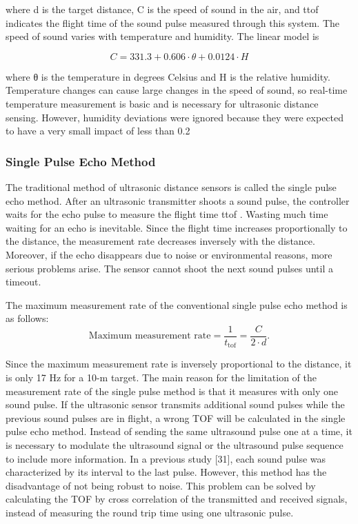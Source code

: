 where d is the target distance, C is the speed of sound in the air, and ttof indicates the flight time of the sound pulse measured through this system. The speed of sound varies with temperature and humidity. The linear model is

\begin{equation*} C = 331.3 + 0.606 \cdot \theta + 0.0124 \cdot H \tag{2}\end{equation*}

where θ is the temperature in degrees Celsius and H is the relative humidity. Temperature changes can cause large changes in the speed of sound, so real-time temperature measurement is basic and is necessary for ultrasonic distance sensing. However, humidity deviations were ignored because they were expected to have a very small impact of less than 0.2 %

\subsubsection{Single Pulse Echo Method}
The traditional method of ultrasonic distance sensors is called the single pulse echo method. After an ultrasonic transmitter shoots a sound pulse, the controller waits for the echo pulse to measure the flight time ttof . Wasting much time waiting for an echo is inevitable. Since the flight time increases proportionally to the distance, the measurement rate decreases inversely with the distance. Moreover, if the echo disappears due to noise or environmental reasons, more serious problems arise. The sensor cannot shoot the next sound pulses until a timeout.

The maximum measurement rate of the conventional single pulse echo method is as follows:
\begin{equation*} \text {Maximum measurement rate} = \frac {1}{t_{\text {tof}}} = \frac {C}{2 \cdot d}. \tag{3}\end{equation*}

Since the maximum measurement rate is inversely proportional to the distance, it is only 17 Hz for a 10-m target. The main reason for the limitation of the measurement rate of the single pulse method is that it measures with only one sound pulse. If the ultrasonic sensor transmits additional sound pulses while the previous sound pulses are in flight, a wrong TOF will be calculated in the single pulse echo method. Instead of sending the same ultrasound pulse one at a time, it is necessary to modulate the ultrasound signal or the ultrasound pulse sequence to include more information. In a previous study [31], each sound pulse was characterized by its interval to the last pulse. However, this method has the disadvantage of not being robust to noise. This problem can be solved by calculating the TOF by cross correlation of the transmitted and received signals, instead of measuring the round trip time using one ultrasonic pulse.

